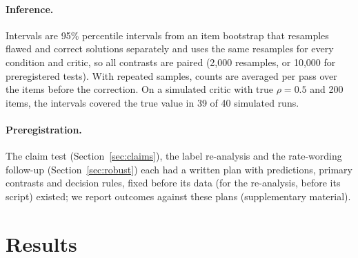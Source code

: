 \documentclass[letterpaper]{article} %
\begin{document}
\paragraph{Inference.} Intervals are 95\% percentile intervals from an item bootstrap that resamples flawed and correct solutions separately and uses the same resamples for every condition and critic, so all contrasts are paired (2,000 resamples, or 10,000 for preregistered tests). With repeated samples, counts are averaged per pass over the items before the correction. On a simulated critic with true $\rho=0.5$ and 200 items, the intervals covered the true value in 39 of 40 simulated runs.

\paragraph{Preregistration.} The claim test (Section~\ref{sec:claims}), the label re-analysis and the rate-wording follow-up (Section~\ref{sec:robust}) each had a written plan with predictions, primary contrasts and decision rules, fixed before its data (for the re-analysis, before its script) existed; we report outcomes against these plans (supplementary material).

\section{Results}
\end{document}
